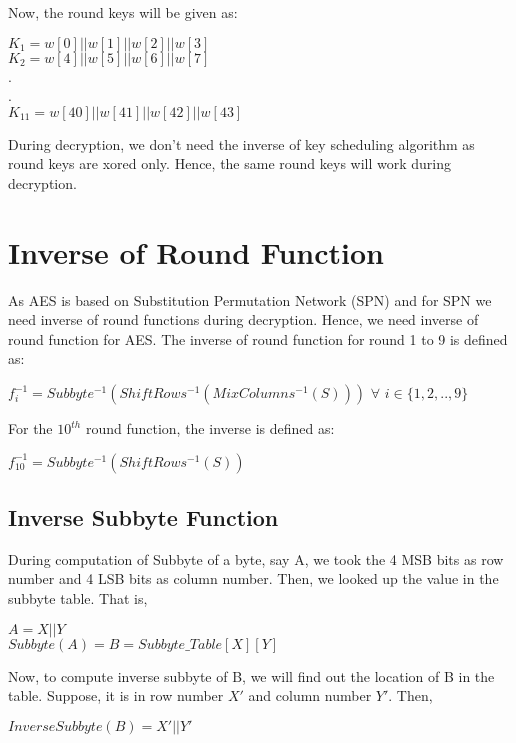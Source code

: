 \documentclass[11pt]{article}
\begin{document}
Now, the round keys will be given as:
\begin{center}
    $K_1 = w[0] || w[1] || w[2] || w[3]$\\
    \vspace{1mm}
    $K_2 = w[4] || w[5] || w[6] || w[7]$\\
    \vspace{1mm}
    .\\
    .\\
    $K_{11} = w[40] || w[41] || w[42] || w[43]$\\
    \vspace{1mm}
\end{center}

During decryption, we don't need the inverse of key scheduling algorithm as round keys are xored only. Hence, the same round keys will work during decryption.

\section{Inverse of Round Function}
As AES is based on Substitution Permutation Network (SPN) and for SPN we need inverse of round functions during decryption. Hence, we need inverse of round function for AES. The inverse of round function for round 1 to 9 is defined as:
\begin{center}
    $f_i^{-1} = Subbyte^{-1}(ShiftRows^{-1}(MixColumns^{-1}(S)))$ $\forall$ $i \in \{1,2,..,9\}$
\end{center}
For the $10^{th}$ round function, the inverse is defined as:
\begin{center}
    $f_{10}^{-1} = Subbyte^{-1}(ShiftRows^{-1}(S))$
\end{center}

\subsection{Inverse Subbyte Function}
During computation of Subbyte of a byte, say A, we took the 4 MSB bits as row number and 4 LSB bits as column number. Then, we looked up the value in the subbyte table. That is, 
\begin{center}
    $A = X || Y$\\
    \vspace{1mm}
    $Subbyte(A) = B = Subbyte\_Table[X][Y]$
\end{center}
Now, to compute inverse subbyte of B, we will find out the location of B in the table. Suppose, it is in row number $X'$ and column number $Y'$. Then,
\begin{center}
    $InverseSubbyte(B) = X' || Y'$
\end{center}
\end{document}
